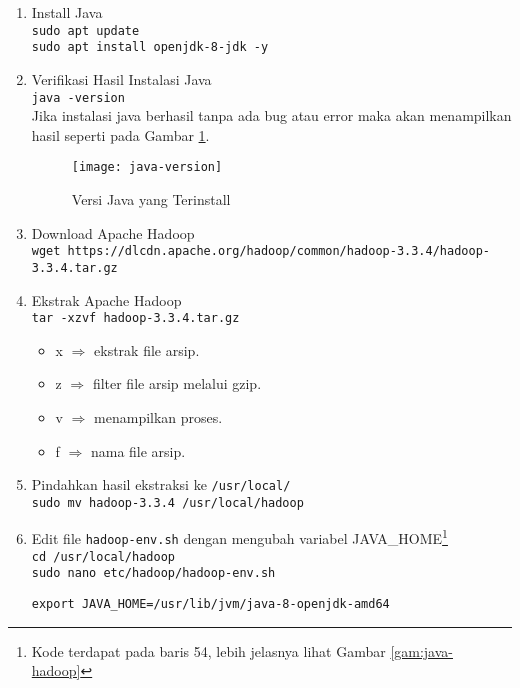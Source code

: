 \documentclass[a4paper]{tufte-handout}
\begin{document}
\begin{enumerate}
\item Install Java \\
{\tt sudo apt update} \\
{\tt sudo apt install openjdk-8-jdk -y} \\

\item Verifikasi Hasil Instalasi Java \\
{\tt java -version} \\
Jika instalasi java berhasil tanpa ada bug atau error maka akan menampilkan hasil seperti pada Gambar \ref{gam:java-version}.

\begin{figure}
\texttt{[image: java-version]}
\caption{Versi Java yang Terinstall}
\label{gam:java-version}
\end{figure}

\item Download Apache Hadoop \\
{\tt wget https://dlcdn.apache.org/hadoop/common/hadoop-3.3.4/hadoop-3.3.4.tar.gz}

\item Ekstrak Apache Hadoop \\
{\tt tar -xzvf hadoop-3.3.4.tar.gz }
\begin{itemize}
\item x $\Rightarrow$ ekstrak file arsip.
\item z $\Rightarrow$ filter file arsip melalui gzip.
\item v $\Rightarrow$ menampilkan proses.
\item f $\Rightarrow$ nama file arsip.
\end{itemize}

\item Pindahkan hasil ekstraksi ke {\tt /usr/local/} \\
{\tt sudo mv hadoop-3.3.4 /usr/local/hadoop}

\item Edit file {\tt hadoop-env.sh} dengan mengubah variabel JAVA\_HOME\footnote{Kode terdapat pada baris 54, lebih jelasnya lihat Gambar \ref{gam:java-hadoop}} \\
{\tt cd /usr/local/hadoop} \\
{\tt sudo nano etc/hadoop/hadoop-env.sh} \\
\begin{lstlisting}
export JAVA_HOME=/usr/lib/jvm/java-8-openjdk-amd64
\end{lstlisting}


\end{enumerate}
\end{document}
